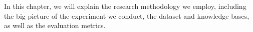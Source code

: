 \chapter{\babTiga}
\label{bab:3}

In this chapter, we will explain the research methodology we employ, including the big picture of the experiment we conduct, the dataset and knowledge bases, as well as the evaluation metrics.

